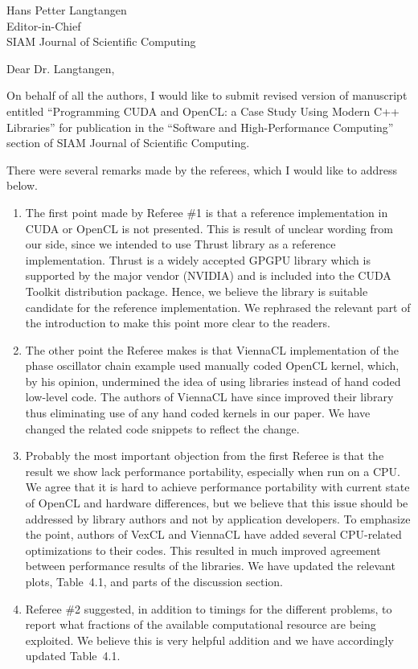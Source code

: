 \documentclass[a4paper,11pt]{letter}
\begin{document}
\begin{letter}{
    Hans Petter Langtangen\\
    Editor-in-Chief\\
    SIAM Journal of Scientific Computing
    }
\opening{Dear Dr. Langtangen,}

On behalf of all the authors, I would like to submit revised version of
manuscript entitled ``Programming CUDA and OpenCL: a Case Study Using Modern
C++ Libraries'' for publication in the ``Software and High-Performance
Computing'' section of SIAM Journal of Scientific Computing.

There were several remarks made by the referees, which I would like to address
below.

\begin{enumerate}
    \item The first point made by Referee \#1 is that a reference
        implementation in CUDA or OpenCL is not presented. This is result of
        unclear wording from our side, since we intended to use Thrust library
        as a reference implementation. Thrust is a widely accepted GPGPU
        library which is supported by the major vendor (NVIDIA) and is included
        into the CUDA Toolkit distribution package. Hence, we believe the
        library is suitable candidate for the reference implementation. We
        rephrased the relevant part of the introduction to make this point more
        clear to the readers.
    \item The other point the Referee makes is that ViennaCL implementation of
        the phase oscillator chain example used manually coded OpenCL kernel,
        which, by his opinion, undermined the idea of using libraries instead
        of hand coded low-level code. The authors of ViennaCL have since
        improved their library thus eliminating use of any hand coded kernels
        in our paper. We have changed the related code snippets to reflect the
        change.
    \item Probably the most important objection from the first Referee is that
        the result we show lack performance portability, especially when run on
        a CPU. We agree that it is hard to achieve performance portability with
        current state of OpenCL and hardware differences, but we believe that
        this issue should be addressed by library authors and not by
        application developers. To emphasize the point, authors of
        VexCL and ViennaCL %
        have added several CPU-related optimizations to their codes.
        This resulted in much improved agreement between performance results of
        the libraries. We have updated the relevant plots, Table~4.1, and parts
        of the discussion section.
    \item Referee \#2 suggested, in addition to timings for the different
        problems, to report what fractions of the available computational
        resource are being exploited. We believe this is very helpful addition
        and we have accordingly updated Table~4.1.
\end{enumerate}


\end{letter}
\end{document}
